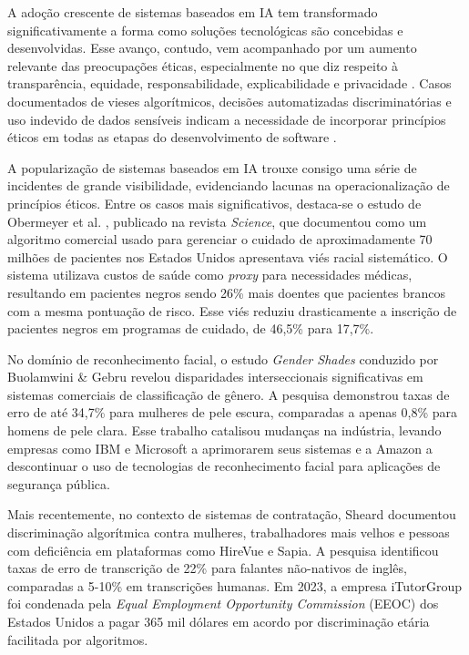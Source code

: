 \label{introducao}

A adoção crescente de sistemas baseados em IA tem transformado significativamente a forma como soluções tecnológicas são concebidas e desenvolvidas. Esse avanço, contudo, vem acompanhado por um aumento relevante das preocupações éticas, especialmente no que diz respeito à transparência, equidade, responsabilidade, explicabilidade e privacidade \cite{Floridi2018, Jobin2019, Ryan2020}. Casos documentados de vieses algorítmicos, decisões automatizadas discriminatórias e uso indevido de dados sensíveis indicam a necessidade de incorporar princípios éticos em todas as etapas do desenvolvimento de software \cite{Mittelstadt2019, Hagendorff2020, Obermeyer2019}.

A popularização de sistemas baseados em IA trouxe consigo uma série de incidentes de grande visibilidade, evidenciando lacunas na operacionalização de princípios éticos. Entre os casos mais significativos, destaca-se o estudo de Obermeyer et al. \cite{Obermeyer2019}, publicado na revista \textit{Science}, que documentou como um algoritmo comercial usado para gerenciar o cuidado de aproximadamente 70 milhões de pacientes nos Estados Unidos apresentava viés racial sistemático. O sistema utilizava custos de saúde como \textit{proxy} para necessidades médicas, resultando em pacientes negros sendo 26\% mais doentes que pacientes brancos com a mesma pontuação de risco. Esse viés reduziu drasticamente a inscrição de pacientes negros em programas de cuidado, de 46,5\% para 17,7\%.

No domínio de reconhecimento facial, o estudo \textit{Gender Shades} conduzido por Buolamwini \& Gebru \cite{Buolamwini2018} revelou disparidades interseccionais significativas em sistemas comerciais de classificação de gênero. A pesquisa demonstrou taxas de erro de até 34,7\% para mulheres de pele escura, comparadas a apenas 0,8\% para homens de pele clara. Esse trabalho catalisou mudanças na indústria, levando empresas como IBM e Microsoft a aprimorarem seus sistemas e a Amazon a descontinuar o uso de tecnologias de reconhecimento facial para aplicações de segurança pública.

Mais recentemente, no contexto de sistemas de contratação, Sheard \cite{Sheard2025} documentou discriminação algorítmica contra mulheres, trabalhadores mais velhos e pessoas com deficiência em plataformas como HireVue e Sapia. A pesquisa identificou taxas de erro de transcrição de 22\% para falantes não-nativos de inglês, comparadas a 5-10\% em transcrições humanas. Em 2023, a empresa iTutorGroup foi condenada pela \textit{Equal Employment Opportunity Commission} (EEOC) dos Estados Unidos a pagar 365 mil dólares em acordo por discriminação etária facilitada por algoritmos.

